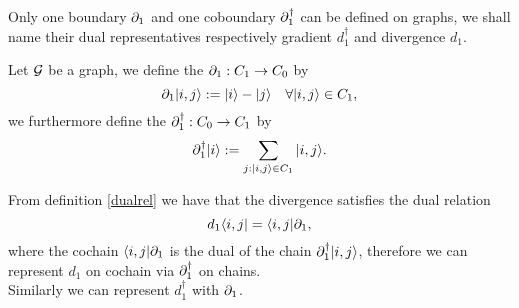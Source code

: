\documentclass[../2.tex]{subfiles}
\begin{document}
    Only one boundary $\partial_1$ and one coboundary $\partial_1^\dagger$ can be defined on graphs, we shall name their dual representatives  respectively gradient $d_1^\dagger$ and divergence $d_1$.

    \begin{defn}
        Let $\mathcal{G}$ be a graph, we define the  $\partial_1 : C_1 \to C_0$ by 
        \[ \partial_1| i,j \rangle := | i \rangle - | j \rangle \quad \forall | i,j \rangle \in C_1,\]
        we furthermore define the  $\partial^\dagger_1 : C_0 \to C_1$ by 
        \[ \partial^\dagger_1| i \rangle := \sum_{j : | i,j \rangle \in C_1} | i,j \rangle.\]
    \end{defn}

    From definition \ref{dualrel} we have that the divergence satisfies the dual relation
    \[ d_1\langle i,j | = \langle i,j |\partial_1,\]
    where the cochain $\langle i,j |\partial_1$ is the dual of the chain $\partial_1^\dagger| i,j \rangle$,
    therefore we can represent $d_1$ on cochain via $\partial_1^\dagger$ on chains.\\
    Similarly we can represent $d_1^\dagger$ with $\partial_1$.





\end{document}
